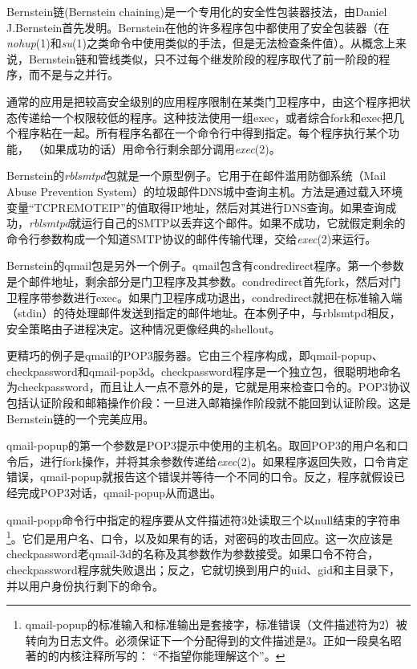 \documentclass[12pt,oneside]{ctexbook}
\begin{document}
\begin{common-format}
Bernstein链(Bernstein  chaining)是一个专用化的安全性包装器技法，由Daniel J.Bernstein首先发明。Bernstein在他的许多程序包中都使用了安全包装器（在\textit{nohup}(1)和\textit{su}(1)之类命令中使用类似的手法，但是无法检查条件值）。从概念上来说，Bernstein链和管线类似，只不过每个继发阶段的程序取代了前一阶段的程序，而不是与之并行。

通常的应用是把较高安全级别的应用程序限制在某类门卫程序中，由这个程序把状态传递给一个权限较低的程序。这种技法使用一组exec，或者综合fork和exec把几个程序粘在一起。所有程序名都在一个命令行中得到指定。每个程序执行某个功能，  （如果成功的话）用命令行剩余部分调用\textit{exec}(2)。

Bernstein的\textit{rblsmtpd}包就是一个原型例子。它用于在邮件滥用防御系统（Mail Abuse Prevention System）的垃圾邮件DNS城中查询主机。方法是通过载入环境变量“TCPREMOTEIP”的值取得IP地址，然后对其进行DNS查询。如果查询成功，\textit{rblsmtpd}就运行自己的SMTP以丢弃这个邮件。如果不成功，它就假定剩余的命令行参数构成一个知道SMTP协议的邮件传输代理，交给\textit{exec}(2)来运行。

Bernstein的qmail包是另外一个例子。qmail包含有condredirect程序。第一个参数是个邮件地址，剩余部分是门卫程序及其参数。condredirect首先fork，然后对门卫程序带参数进行exec。如果门卫程序成功退出，condredirect就把在标准输入端（stdin）的待处理邮件发送到指定的邮件地址。在本例子中，与rblsmtpd相反，安全策略由子进程决定。这种情况更像经典的shellout。

更精巧的例子是qmail的POP3服务器。它由三个程序构成，即qmail-popup、checkpassword和qmail-pop3d。checkpassword程序是一个独立包，很聪明地命名为checkpassword，而且让人一点不意外的是，它就是用来检查口令的。POP3协议包括认证阶段和邮箱操作价段：一旦进入邮箱操作阶段就不能回到认证阶段。这是Bernstein链的一个完美应用。

qmail-popup的第一个参数是POP3提示中使用的主机名。取回POP3的用户名和口令后，进行fork操作，并将其余参数传递给\textit{exec}(2)。如果程序返回失败，口令肯定错误，qmail-popup就报告这个错误并等待一个不同的口令。反之，程序就假设已经完成POP3对话，qmail-popup从而退出。

qmail-popp命令行中指定的程序要从文件描述符3处读取三个以null结束的字符串\footnote{qmail-popup的标准输入和标准输出是套接字，标准错误（文件描述符为2）被转向为日志文件。必须保证下一个分配得到的文件描述是3。正如一段臭名昭著的的内核注释所写的：  “不指望你能理解这个”。}。它们是用户名、口令，以及如果有的话，对密码的攻击回应。这一次应该是checkpassword老qmail-3d的名称及其参数作为参数接受。如果口令不符合，checkpassword程序就失败退出；反之，它就切换到用户的uid、gid和主目录下，并以用户身份执行剩下的命令。


\end{common-format}
\end{document}
